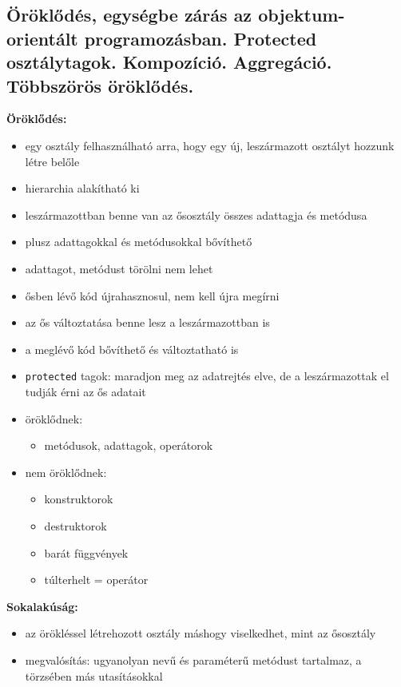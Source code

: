 \subsection{Öröklődés, egységbe zárás az objektum-orientált programozásban. Protected osztálytagok. Kompozíció. Aggregáció. Többszörös öröklődés.}

\textbf{Öröklődés:}
\begin{itemize}
    \item egy osztály felhasználható arra, hogy egy új, leszármazott osztályt hozzunk létre belőle
    \item hierarchia alakítható ki
    \item leszármazottban benne van az ősosztály összes adattagja és metódusa
    \item plusz adattagokkal és metódusokkal bővíthető
    \item adattagot, metódust törölni nem lehet
    \item ősben lévő kód újrahasznosul, nem kell újra megírni
    \item az ős változtatása benne lesz a leszármazottban is
    \item a meglévő kód bővíthető és változtatható is
    \item \texttt{protected} tagok: maradjon meg az adatrejtés elve, de a leszármazottak el tudják érni az ős adatait
    \item öröklődnek:
    \begin{itemize}
        \item metódusok, adattagok, operátorok
    \end{itemize}
    \item nem öröklődnek:
    \begin{itemize}
        \item konstruktorok
        \item destruktorok
        \item barát függvények
        \item túlterhelt = operátor
    \end{itemize}
\end{itemize}

\textbf{Sokalakúság:}
\begin{itemize}
    \item az örökléssel létrehozott osztály máshogy viselkedhet, mint az ősosztály
    \item megvalósítás: ugyanolyan nevű és paraméterű metódust tartalmaz, a törzsében más utasításokkal
\end{itemize}


